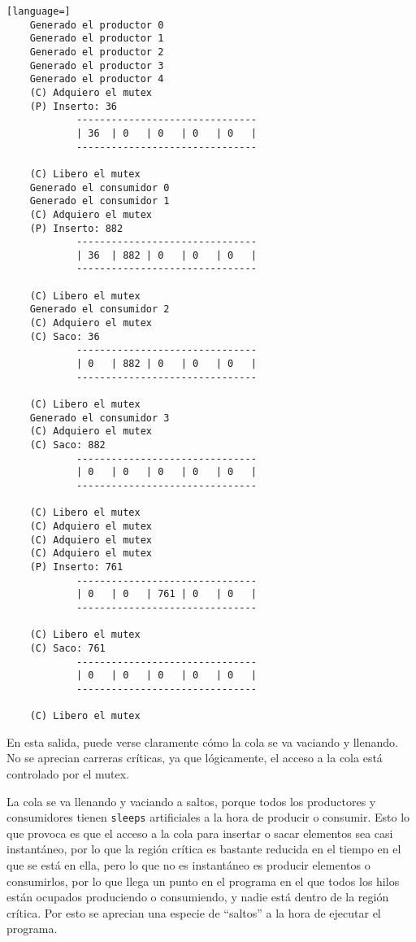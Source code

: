 \documentclass[a4paper]{article}
\begin{document}
\begin{lstlisting}[language=]
    Generado el productor 0
    Generado el productor 1
    Generado el productor 2
    Generado el productor 3
    Generado el productor 4
    (C) Adquiero el mutex
    (P) Inserto: 36
            -------------------------------
            | 36  | 0   | 0   | 0   | 0   |
            -------------------------------
    
    (C) Libero el mutex
    Generado el consumidor 0
    Generado el consumidor 1
    (C) Adquiero el mutex
    (P) Inserto: 882
            -------------------------------
            | 36  | 882 | 0   | 0   | 0   |
            -------------------------------
    
    (C) Libero el mutex
    Generado el consumidor 2
    (C) Adquiero el mutex
    (C) Saco: 36
            -------------------------------
            | 0   | 882 | 0   | 0   | 0   |
            -------------------------------
    
    (C) Libero el mutex
    Generado el consumidor 3
    (C) Adquiero el mutex
    (C) Saco: 882
            -------------------------------
            | 0   | 0   | 0   | 0   | 0   |
            -------------------------------
    
    (C) Libero el mutex
    (C) Adquiero el mutex
    (C) Adquiero el mutex
    (C) Adquiero el mutex
    (P) Inserto: 761
            -------------------------------
            | 0   | 0   | 761 | 0   | 0   |
            -------------------------------
    
    (C) Libero el mutex
    (C) Saco: 761
            -------------------------------
            | 0   | 0   | 0   | 0   | 0   |
            -------------------------------
    
    (C) Libero el mutex
\end{lstlisting}

En esta salida, puede verse claramente cómo la cola se va vaciando y llenando. No se aprecian carreras críticas, ya que lógicamente, el acceso a la cola está controlado por el mutex.

La cola se va llenando y vaciando a saltos, porque todos los productores y consumidores tienen \texttt{sleeps} artificiales a la hora de producir o consumir. Esto lo que provoca es que el acceso a la cola para insertar o sacar elementos sea casi instantáneo, por lo que la región crítica es bastante reducida en el tiempo en el que se está en ella, pero lo que no es instantáneo es producir elementos o consumirlos, por lo que llega un punto en el programa en el que todos los hilos están ocupados produciendo o consumiendo, y nadie está dentro de la región crítica. Por esto se aprecian una especie de ``saltos'' a la hora de ejecutar el programa.
\end{document}
